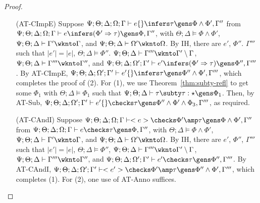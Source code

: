 \begin{proof}
\begin{itemize}
  \item[(AT-CImpE)] Suppose $\Psi ; \Theta ; \Delta ; \Omega ; \Gamma \vdash e \{\} \infers \tau \gens \Phi \wedge \Phi',\Gamma''$ from
  $\Psi ; \Theta ; \Delta ; \Omega ; \Gamma \vdash e \infers (\Phi' \Rightarrow \tau) \gens \Phi,\Gamma''$, with
  $\Theta ; \Delta \vDash \Phi \wedge \Phi'$,
  $\Psi ; \Theta ; \Delta \vdash \Gamma' \wknto \Gamma$, and
  $\Psi ; \Theta ; \Delta \vdash \Omega' \wknto \Omega$.
  By IH, there are $e'$, $\Phi''$. $\Gamma'''$ such that
  $|e'| = |e|$,
  $\Theta ; \Delta \vDash \Phi''$.
  $\Psi ; \Theta ; \Delta \vdash \Gamma''' \wknto \Gamma' \setminus \Gamma$,
  $\Psi ; \Theta ; \Delta \vdash \Gamma''' \wknto \Gamma''$, and
  $\Psi ; \Theta ; \Delta ; \Omega' ; \Gamma' \vdash e' \infers (\Phi' \Rightarrow \tau) \gens \Phi'',\Gamma'''$.
  By AT-CImpE,
  $\Psi ; \Theta ; \Delta ; \Omega' ; \Gamma' \vdash e' \{\} \infers \tau \gens \Phi'' \wedge \Phi',\Gamma'''$,
  which completes the proof of (2). For (1), we use Theorem~\ref{thm:subty-refl} to get some $\Phi_1$ with $\Theta ; \Delta \vDash \Phi_1$
  such that $\Psi ; \Theta ; \Delta \vdash \tau \subty \tau : \star \gens \Phi_1$.
  Then, by AT-Sub,
  $\Psi ; \Theta ; \Delta ; \Omega' ; \Gamma' \vdash e' \{\} \checks \tau \gens \Phi'' \wedge \Phi' \wedge \Phi_3,\Gamma'''$, as required.
  
  \item[(AT-CAndI)] Suppose $\Psi ; \Theta ; \Delta ; \Omega ; \Gamma \vdash <e> \checks \Phi' \amp \tau \gens \Phi \wedge \Phi',\Gamma''$ from
  $\Psi ; \Theta ; \Delta ; \Omega ; \Gamma \vdash e \checks \tau \gens \Phi,\Gamma''$, with
  $\Theta ; \Delta \vDash \Phi \wedge \Phi'$,
  $\Psi ; \Theta ; \Delta \vdash \Gamma' \wknto \Gamma$, and
  $\Psi ; \Theta ; \Delta \vdash \Omega' \wknto \Omega$.
  By IH, there are $e'$, $\Phi''$, $\Gamma'''$ such that
  $|e'| = |e|$,
  $\Theta ; \Delta \vDash \Phi''$,
  $\Psi ; \Theta ; \Delta \vdash \Gamma''' \wknto \Gamma' \setminus \Gamma$,
  $\Psi ; \Theta ; \Delta \vdash \Gamma''' \wknto \Gamma''$, and
  $\Psi ; \Theta ; \Delta ; \Omega' ; \Gamma' \vdash e' \checks \tau \gens \Phi'', \Gamma'''$.
  By AT-CAndI,
  $\Psi ; \Theta ; \Delta ; \Omega' ; \Gamma' \vdash <e'> \checks \Phi' \amp \tau \gens \Phi'' \wedge \Phi',\Gamma'''$,
  which completes (1). For (2), one use of AT-Anno suffices.
  

\end{itemize}
\end{proof}
